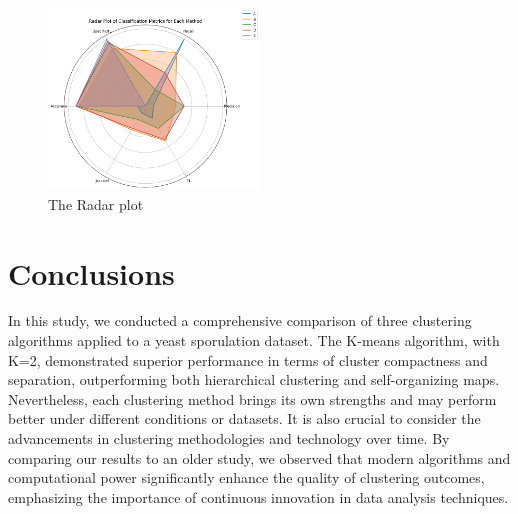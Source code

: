\documentclass{llncs}
\begin{document}
\begin{figure}[h!]
	\begin{center}  %
		\includegraphics[width=0.5\textwidth]{images/radar_plot.png}
		\caption{The Radar plot}
		\label{fig:radar}
	\end{center}
\end{figure}
 
\section{Conclusions}
 
In this study, we conducted a comprehensive comparison of three clustering algorithms applied to a yeast sporulation dataset. The K-means algorithm, with K=2, demonstrated superior performance in terms of cluster compactness and separation, outperforming both hierarchical clustering and self-organizing maps. Nevertheless, each clustering method brings its own strengths and may perform better under different conditions or datasets. It is also crucial to consider the advancements in clustering methodologies and technology over time. By comparing our results to an older study, we observed that modern algorithms and computational power significantly enhance the quality of clustering outcomes, emphasizing the importance of continuous innovation in data analysis techniques.

\end{document}
